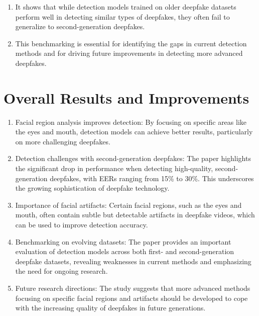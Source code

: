 \documentclass{report}
\begin{document}
	\begin{enumerate}
		\item 
		It shows that while detection models trained on older deepfake datasets perform well in detecting similar types of deepfakes, they often fail to generalize to second-generation deepfakes.
		
		\item 
		This benchmarking is essential for identifying the gaps in current detection methods and for driving future improvements in detecting more advanced deepfakes.
	\end{enumerate}
	
	
	
	\section{Overall Results and Improvements}
	\begin{enumerate}
		\item 
		Facial region analysis improves detection: By focusing on specific areas like the eyes and mouth, detection models can achieve better results, particularly on more challenging deepfakes.
		
		\item 
		Detection challenges with second-generation deepfakes: The paper highlights the significant drop in performance when detecting high-quality, second-generation deepfakes, with EERs ranging from 15\% to 30\%. This underscores the growing sophistication of deepfake technology.
		
		\item 
		Importance of facial artifacts: Certain facial regions, such as the eyes and mouth, often contain subtle but detectable artifacts in deepfake videos, which can be used to improve detection accuracy.
		
		\item 
		Benchmarking on evolving datasets: The paper provides an important evaluation of detection models across both first- and second-generation deepfake datasets, revealing weaknesses in current methods and emphasizing the need for ongoing research.
		
		\item 
		Future research directions: The study suggests that more advanced methods focusing on specific facial regions and artifacts should be developed to cope with the increasing quality of deepfakes in future generations.
	\end{enumerate}
	
\end{document}
